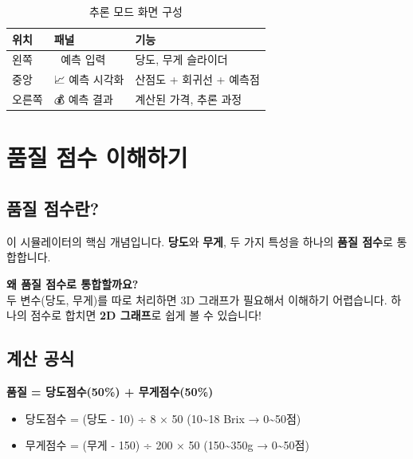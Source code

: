 \documentclass[11pt,a4paper]{article}
\begin{document}
\begin{table}[H]
\centering
\caption{추론 모드 화면 구성}
\label{tab:infermode_layout}
\begin{tabularx}{\textwidth}{l|l|X}
\toprule
\textbf{위치} & \textbf{패널} & \textbf{기능} \\
\midrule
왼쪽 & 🎯 예측 입력 & 당도, 무게 슬라이더 \\
중앙 & 📈 예측 시각화 & 산점도 + 회귀선 + 예측점 \\
오른쪽 & 💰 예측 결과 & 계산된 가격, 추론 과정 \\
\bottomrule
\end{tabularx}
\end{table}

\section{품질 점수 이해하기}

\subsection{품질 점수란?}

이 시뮬레이터의 핵심 개념입니다. \textbf{당도}와 \textbf{무게}, 두 가지 특성을 
하나의 \textbf{품질 점수}로 통합합니다.

\begin{tipbox}
\textbf{왜 품질 점수로 통합할까요?}\\[0.3cm]
두 변수(당도, 무게)를 따로 처리하면 3D 그래프가 필요해서 이해하기 어렵습니다.
하나의 점수로 합치면 \textbf{2D 그래프}로 쉽게 볼 수 있습니다!
\end{tipbox}

\subsection{계산 공식}

\begin{tcolorbox}[colback=grayBg, colframe=gray, title=품질 점수 계산식]
\textbf{품질 = 당도점수(50\%) + 무게점수(50\%)}\\[0.3cm]
\begin{itemize}[leftmargin=*]
  \item 당도점수 = (당도 - 10) ÷ 8 × 50 \quad (10\textasciitilde18 Brix → 0\textasciitilde50점)
  \item 무게점수 = (무게 - 150) ÷ 200 × 50 \quad (150\textasciitilde350g → 0\textasciitilde50점)
\end{itemize}
\end{tcolorbox}
\end{document}
